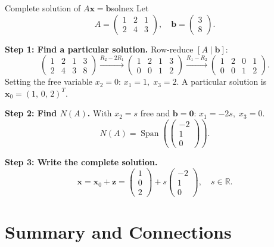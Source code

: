 \documentclass[12pt,a4paper]{article}
\newcommand{\R}{\mathbb{R}}
\newcommand{\vv}[1]{\mathbf{#1}}
\newcommand{\vzero}{\mathbf{0}}
\DeclareMathOperator{\Span}{Span}
\begin{document}
\begin{example}{Complete solution of $A\vv{x}=\vv{b}$}{solnex}
  Let
  \[
    A = \begin{pmatrix}1 & 2 & 1\\2 & 4 & 3\end{pmatrix},
    \quad
    \vv{b} = \begin{pmatrix}3\\8\end{pmatrix}.
  \]

  \textbf{Step 1: Find a particular solution.}\quad
  Row-reduce $[A\mid\vv{b}]$:
  \[
    \begin{pmatrix}1&2&1&3\\2&4&3&8\end{pmatrix}
    \xrightarrow{R_2-2R_1}
    \begin{pmatrix}1&2&1&3\\0&0&1&2\end{pmatrix}
    \xrightarrow{R_1-R_2}
    \begin{pmatrix}1&2&0&1\\0&0&1&2\end{pmatrix}.
  \]
  Setting the free variable $x_2 = 0$: $x_1 = 1,\; x_3 = 2$.
  A particular solution is $\vv{x}_0 = (1,\, 0,\, 2)^T$.

  \textbf{Step 2: Find $N(A)$.}\quad
  With $x_2 = s$ free and $\vv{b}=\vzero$: $x_1=-2s,\; x_3=0$.
  \[
    N(A) = \Span\!\left(\begin{pmatrix}-2\\1\\0\end{pmatrix}\right).
  \]

  \textbf{Step 3: Write the complete solution.}
  \[
    \vv{x}
    = \vv{x}_0 + \vv{z}
    = \begin{pmatrix}1\\0\\2\end{pmatrix}
    + s\begin{pmatrix}-2\\1\\0\end{pmatrix},
    \quad s \in \R.
  \]
\end{example}

\section{Summary and Connections}
\end{document}

